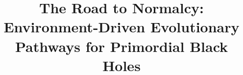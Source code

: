 \documentclass[twocolumn,trackchanges]{aastex701}
\begin{document}
\title{The Road to Normalcy: Environment-Driven Evolutionary Pathways for Primordial Black Holes}

\end{document}
